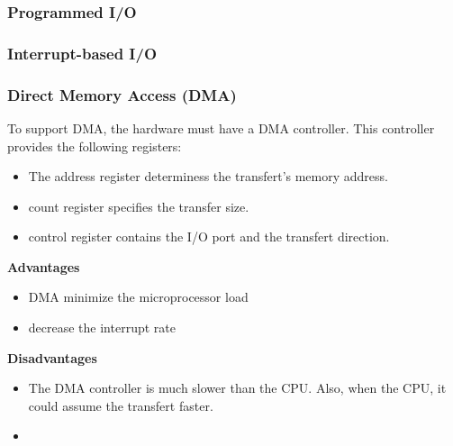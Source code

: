 %
%
%

\begin{frame}
  \frametitle{Programmed I/O}



\end{frame}


%
%
%

\begin{frame}
  \frametitle{Interrupt-based I/O}



\end{frame}

%
%
%

\begin{frame}
  \frametitle{Direct Memory Access (DMA)}

  To support DMA, the hardware must have a DMA controller. This controller
  provides the following registers:

  \begin{itemize}
    \item The address register determiness the transfert's memory address.
    \item count register specifies the transfer size.
    \item control register contains the I/O port and the transfert direction.
  \end{itemize}

  \nl

  {\bf Advantages}\\
  \begin{itemize}
    \item DMA minimize the microprocessor load
    \item decrease the interrupt rate
  \end{itemize}

  {\bf Disadvantages}\\
  \begin{itemize}
    \item The DMA controller is much slower than the CPU. Also, when the CPU,
      it could assume the transfert faster.
    \item 
  \end{itemize}

\end{frame}
